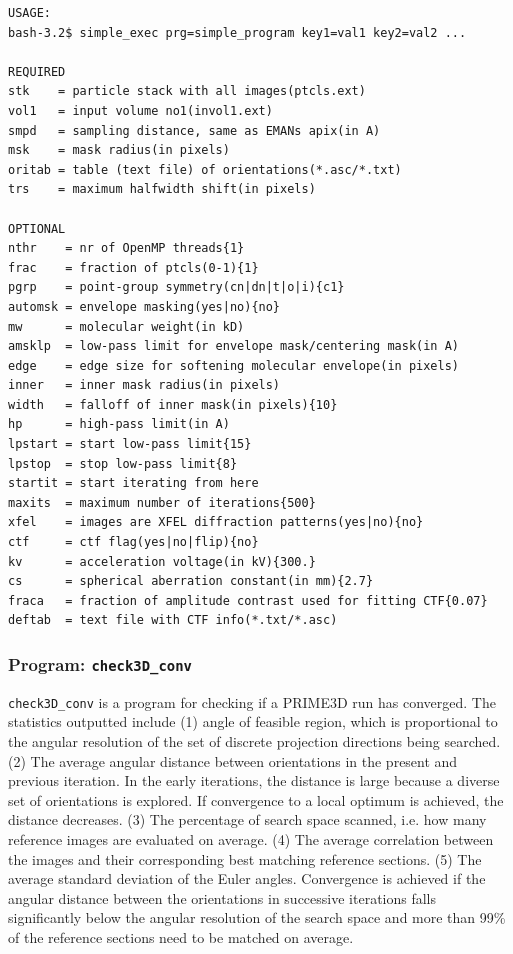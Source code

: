 \documentclass[a4paper,11pt]{article}
\newcommand{\prgname}[1]{\textcolor{NavyBlue}{\texttt{#1}}}
\begin{document}
\begin{verbatim}
USAGE:
bash-3.2$ simple_exec prg=simple_program key1=val1 key2=val2 ...

REQUIRED
stk    = particle stack with all images(ptcls.ext)
vol1   = input volume no1(invol1.ext)
smpd   = sampling distance, same as EMANs apix(in A)
msk    = mask radius(in pixels)
oritab = table (text file) of orientations(*.asc/*.txt)
trs    = maximum halfwidth shift(in pixels)

OPTIONAL
nthr    = nr of OpenMP threads{1}
frac    = fraction of ptcls(0-1){1}
pgrp    = point-group symmetry(cn|dn|t|o|i){c1}
automsk = envelope masking(yes|no){no}
mw      = molecular weight(in kD)
amsklp  = low-pass limit for envelope mask/centering mask(in A)
edge    = edge size for softening molecular envelope(in pixels)
inner   = inner mask radius(in pixels)
width   = falloff of inner mask(in pixels){10}
hp      = high-pass limit(in A)
lpstart = start low-pass limit{15}
lpstop  = stop low-pass limit{8}
startit = start iterating from here
maxits  = maximum number of iterations{500}
xfel    = images are XFEL diffraction patterns(yes|no){no}
ctf     = ctf flag(yes|no|flip){no}
kv      = acceleration voltage(in kV){300.}
cs      = spherical aberration constant(in mm){2.7}
fraca   = fraction of amplitude contrast used for fitting CTF{0.07}
deftab  = text file with CTF info(*.txt/*.asc)
\end{verbatim}

\subsubsection{Program: \prgname{check3D\_conv}}
\label{check3D_conv}
\prgname{check3D\_conv} is a program for checking if a PRIME3D run has converged. The statistics outputted include (1) angle of feasible region, which is proportional to the angular resolution of the set of discrete projection directions being searched. (2) The average angular distance between orientations in the present and previous iteration. In the early iterations, the distance is large because a diverse set of orientations is explored. If convergence to a local optimum is achieved, the distance decreases. (3) The percentage of search space scanned, i.e. how many reference images are evaluated on average. (4) The average correlation between the images and their corresponding best matching reference sections. (5) The average standard deviation of the Euler angles. Convergence is achieved if the angular distance between the orientations in successive iterations falls significantly below the angular resolution of the search space and more than 99\% of the reference sections need to be matched on average.
\end{document}
